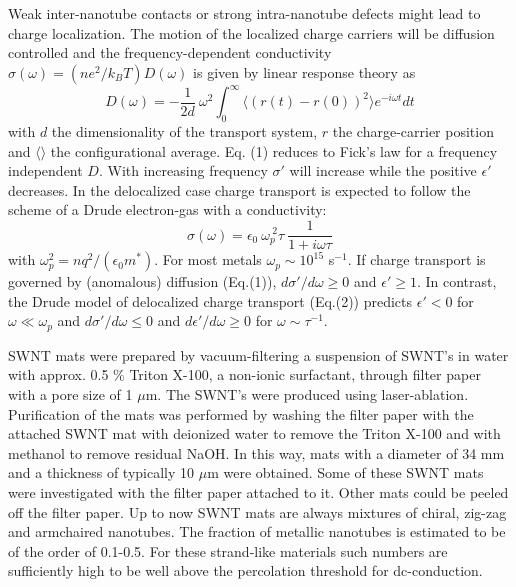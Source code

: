 \begin{multicols}{2}
Weak inter-nanotube contacts or strong intra-nanotube defects might lead to
charge localization. The motion of the localized charge carriers will be
diffusion controlled and the frequency-dependent conductivity
$\sigma(\omega) = ({ne^2}/{k_B T})D(\omega)$ is given by linear response
theory as\cite{Scherlax73}
\begin{equation}
D(\omega) = -\frac{1}{2d}\: {\omega}^2 \int_{0}^{\infty}
\langle (r(t) - r(0))^2 \rangle e^{-i\omega t} dt
\end{equation}
with $d$ the dimensionality of the transport system, $r$ the
charge-carrier position and $\langle \rangle$ the configurational average.
Eq. (1) reduces to Fick's law for a frequency independent $D$. With
increasing frequency $\sigma'$ will increase while the positive $\epsilon'$
decreases\cite{Schirmacher91,Adriaanse97}. In the delocalized case
charge transport is expected to follow the scheme of a Drude electron-gas
with a conductivity:
\begin{equation}
\sigma(\omega) = \epsilon_0\:\omega_p^{\:2} \tau
\:\frac{1}{1+i\omega\tau}
\end{equation}
with $\omega_p^2 = {nq^2}/({\epsilon_0 m^*})$\cite{AM}.
For most metals $\omega_p \sim 10^{15}$ s$^{-1}$. If charge transport is
governed by (anomalous) diffusion (Eq.(1)), $d\sigma'/d\omega \ge 0$ and
$\epsilon' \ge 1$. In contrast, the Drude model of delocalized charge
transport (Eq.(2)) predicts $\epsilon' < 0$ for $\omega\ll\omega_p$ and
$d\sigma'/d\omega \le 0$ and $d\epsilon'/d\omega \ge 0$ for $\omega \sim
\tau^{-1}$.

SWNT mats\cite{Rice99} were prepared by vacuum-filtering a suspension of
SWNT's in water with approx. 0.5 \% Triton X-100, a non-ionic surfactant,
through filter paper with a pore size of 1 $\mu$m. The SWNT's were
produced using laser-ablation\cite{Thess96}. Purification of the
mats was performed by washing the filter paper with the attached
SWNT mat with deionized water to remove the Triton X-100 and with
methanol to remove residual NaOH\cite{Rinzler98}. In this way,
mats with a diameter of 34 mm and a thickness of typically 10
$\mu$m were obtained. Some of these SWNT mats were investigated
with the filter paper attached to it. Other mats could be peeled
off the filter paper. Up to now SWNT mats are always mixtures of chiral,
zig-zag and armchaired nanotubes. The fraction of metallic nanotubes is
estimated to be of the order of 0.1-0.5\cite{Fischer97,Petit97,Ugawa99}. For
these strand-like materials such numbers are sufficiently high to be well
above the percolation threshold for dc-conduction\cite{Adriaanse97}.


\end{multicols}
